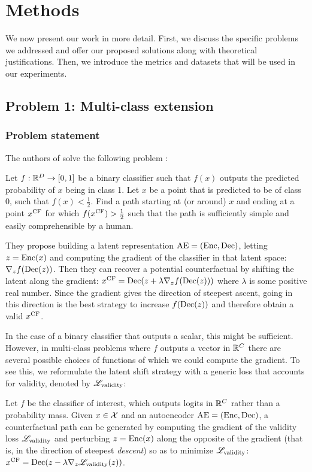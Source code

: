 \documentclass[../main.tex]{subfiles}
\begin{document}
\chapter{Methods}
\label{ch:methods}

We now present our work in more detail.
First, we discuss the specific problems we addressed and offer our proposed solutions along with theoretical justifications.
Then, we introduce the metrics and datasets that will be used in our experiments.

\section{Problem 1: Multi-class extension}

\subsection{Problem statement}

The authors of \ls{} solve the following problem \cite{cohenGifsplanation2022}:

Let $f: \mathbb{R}^D \to [0, 1]$ be a binary classifier such that $f(x)$ outputs the predicted probability of $x$ being in class 1.
Let $x$ be a point that is predicted to be of class 0, \ie{} such that $f(x) < \frac{1}{2}$.
Find a path starting at (or around) $x$ and ending at a point $x^\mathrm{CF}$ for which $f(x^\mathrm{CF}) > \frac{1}{2}$ such that the path is sufficiently simple and easily comprehensible by a human.

They propose building a latent representation $\mathrm{AE} = (\operatorname{Enc}, \operatorname{Dec})$, letting $z = \operatorname{Enc}(x)$ and computing the gradient of the classifier in that latent space:
$\nabla_z f(\operatorname{Dec}(z))$.
Then they can recover a potential counterfactual by shifting the latent along the gradient: $x^\mathrm{CF} = \operatorname{Dec}(z + \lambda \nabla_z f(\operatorname{Dec}(z)))$ where $\lambda$ is some positive real number.
Since the gradient gives the direction of steepest ascent, going in this direction is the best strategy to increase $f(\operatorname{Dec}(z))$ and therefore obtain a valid $x^\mathrm{CF}$.

In the case of a binary classifier that outputs a scalar, this might be sufficient. However, in multi-class problems where $f$ outputs a vector in $\mathbb{R}^C$ there are several possible choices of functions of which we could compute the gradient.
To see this, we reformulate the latent shift strategy with a generic loss that accounts for validity, denoted by $\mathscr{L}_\text{validity}$:

Let $f$ be the classifier of interest, which outputs logits in $\mathbb{R}^C$ rather than a probability mass.
Given $x \in \mathcal{X}$ and an autoencoder $\mathrm{AE} = (\operatorname{Enc}, \operatorname{Dec})$, a counterfactual path can be generated by computing the gradient of the validity loss $\mathscr{L}_\text{validity}$ and perturbing $z = \operatorname{Enc}(x)$ along the opposite of the gradient (that is, in the direction of steepest \emph{descent}) so as to minimize $\mathscr{L}_\text{validity}$:
$x^\mathrm{CF} = \operatorname{Dec}(z - \lambda \nabla_z \mathscr{L}_\text{validity}(z))$.
\end{document}

